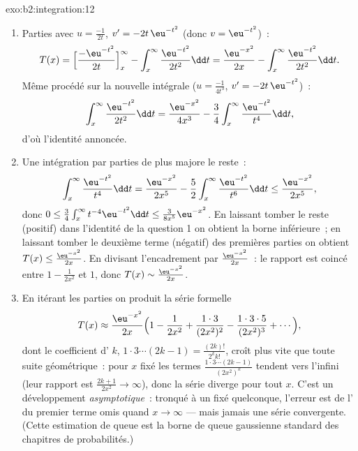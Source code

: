 \begin{solution}{exo:b2:integration:12}
\begin{enumerate}
  \item Parties avec $u = \frac{-1}{2t}$, $v' = -2t\,\eu^{-t^2}$
        (donc $v = \eu^{-t^2}$)~:
        \[
        T(x) = \Bigl[\frac{-\eu^{-t^2}}{2t}\Bigr]_x^\infty
        - \int_x^\infty \frac{\eu^{-t^2}}{2t^2}\dd t
        = \frac{\eu^{-x^2}}{2x}
        - \int_x^\infty \frac{\eu^{-t^2}}{2t^2}\dd t .
        \]
        Même procédé sur la nouvelle intégrale ($u = \frac{-1}{4t^3}$,
        $v' = -2t\,\eu^{-t^2}$)~:
        \[
        \int_x^\infty \frac{\eu^{-t^2}}{2t^2}\dd t
        = \frac{\eu^{-x^2}}{4x^3}
        - \frac34\int_x^\infty \frac{\eu^{-t^2}}{t^4}\dd t ,
        \]
        d'où l'identité annoncée.
  \item Une intégration par parties de plus majore le reste~:
        \[
        \int_x^\infty \frac{\eu^{-t^2}}{t^4}\dd t
        = \frac{\eu^{-x^2}}{2x^5}
        - \frac52\int_x^\infty\frac{\eu^{-t^2}}{t^6}\dd t
        \leq \frac{\eu^{-x^2}}{2x^5},
        \]
        donc $0 \leq \frac34\int_x^\infty t^{-4}\eu^{-t^2}\dd t
        \leq \frac{3}{8x^5}\eu^{-x^2}$. En laissant tomber le reste (positif)
        dans l'identité de la question 1 on obtient la borne
        inférieure~; en laissant tomber le deuxième terme (négatif) des premières
        parties on obtient $T(x) \leq \frac{\eu^{-x^2}}{2x}$. En divisant
        l'encadrement par $\frac{\eu^{-x^2}}{2x}$~: le rapport est
        coincé entre $1 - \frac{1}{2x^2}$ et $1$, donc $T(x)
        \sim \frac{\eu^{-x^2}}{2x}$.
  \item En itérant les parties on produit la série formelle
        \[
        T(x) \approx \frac{\eu^{-x^2}}{2x}\Bigl(1 -
        \frac{1}{2x^2} + \frac{1\cdot3}{(2x^2)^2} -
        \frac{1\cdot3\cdot5}{(2x^2)^3} + \cdots\Bigr),
        \]
        dont le coefficient d' $k$, $1\cdot3\cdots(2k-1) =
        \frac{(2k)!}{2^k k!}$, croît plus vite que toute suite
        géométrique~: pour $x$ fixé les termes
        $\frac{1\cdot3\cdots(2k-1)}{(2x^2)^k}$ tendent vers l'infini
        (leur rapport est $\frac{2k+1}{2x^2} \to \infty$), donc la
        série diverge pour tout $x$. C'est un
        développement \emph{asymptotique}~: tronqué à un 
        fixé quelconque, l'erreur est de l' du premier terme
        omis quand $x \to \infty$ --- mais jamais une série
        convergente. (Cette estimation de queue est la borne de queue
        gaussienne standard des chapitres de probabilités.)
\end{enumerate}
\end{solution}

